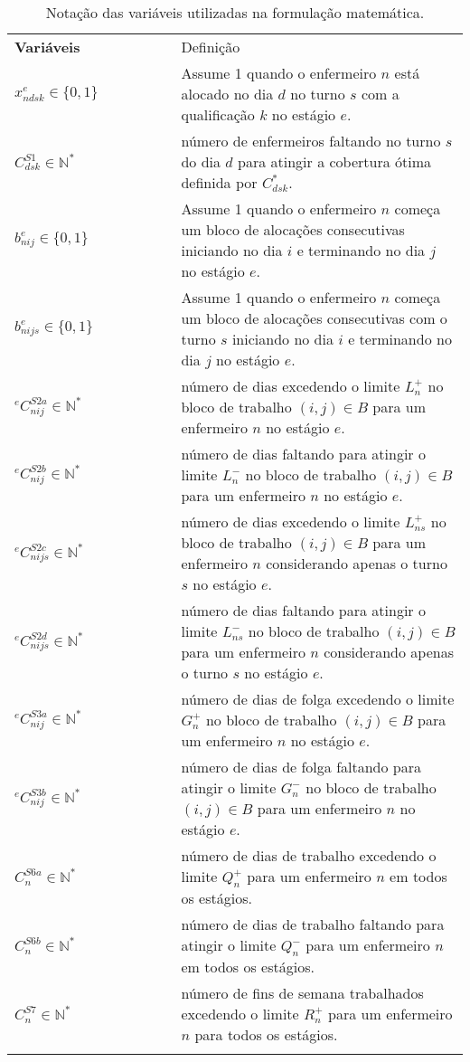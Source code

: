 \documentclass[cic,tc, twoside]{iiufrgs}
\begin{document}
\begin{table}[H]
\centering
\caption{Notação das variáveis utilizadas na formulação matemática.}
\small
\begin{tabularx}{\linewidth}{l@{}X}
\hline\noalign{\smallskip}
\textbf{Variáveis}{~~~~~~~~~~~~}  & Definição  \\
\noalign{\smallskip}\hline\noalign{\smallskip}
$x^e_{ndsk} \in \{0,1\}$        & Assume 1 quando o enfermeiro $n$ está alocado no dia $d$ no turno $s$ com a qualificação $k$ no estágio $e$.  \\
$C^{S1}_{dsk} \in \mathbb{N^*}$   & número de enfermeiros faltando no turno $s$ do dia $d$ para atingir a cobertura ótima definida por $C^*_{dsk}$.  \\
$b^e_{nij} \in  \{0,1\} $ & Assume 1 quando o enfermeiro $n$ começa um bloco de alocações consecutivas iniciando no dia $i$ e terminando no dia $j$ no estágio $e$.\\
$b^e_{nijs} \in  \{0,1\} $ & Assume 1 quando o enfermeiro $n$ começa um bloco de alocações consecutivas com o turno $s$ iniciando no dia $i$ e terminando no dia $j$ no estágio $e$.\\
$^eC^{S2a}_{nij} \in \mathbb{N^*}$   & número de dias excedendo o limite $L^+_{n}$ no bloco de trabalho $(i,j) \in B$ para um enfermeiro $n$ no estágio $e$.  \\
$^eC^{S2b}_{nij} \in \mathbb{N^*}$   & número de dias faltando para atingir o limite $L^-_{n}$ no bloco de trabalho $(i,j) \in B$ para um enfermeiro $n$ no estágio $e$.  \\
$^eC^{S2c}_{nijs} \in \mathbb{N^*}$   & número de dias excedendo o limite $L^+_{ns}$ no bloco de trabalho $(i,j) \in B$ para um enfermeiro $n$ considerando apenas o turno $s$ no estágio $e$.  \\
$^eC^{S2d}_{nijs} \in \mathbb{N^*}$   & número de dias faltando para atingir o limite $L^-_{ns}$ no bloco de trabalho $(i,j) \in B$ para um enfermeiro $n$ considerando apenas o turno $s$ no estágio $e$.  \\
$^eC^{S3a}_{nij} \in \mathbb{N^*}$   & número de dias de folga excedendo o limite $G^+_{n}$ no bloco de trabalho $(i,j) \in B$ para um enfermeiro $n$ no estágio $e$.  \\
$^eC^{S3b}_{nij} \in \mathbb{N^*}$   & número de dias de folga faltando para atingir o limite $G^-_{n}$ no bloco de trabalho $(i,j) \in B$ para um enfermeiro $n$ no estágio $e$.  \\
$C^{S6a}_{n} \in \mathbb{N^*}$   & número de dias de trabalho excedendo o limite $Q^+_{n}$ para um enfermeiro $n$ em todos os estágios. \\
$C^{S6b}_{n} \in \mathbb{N^*}$   & número de dias de trabalho faltando para atingir o limite $Q^-_{n}$ para um enfermeiro $n$ em todos os estágios. \\
$C^{S7}_{n} \in \mathbb{N^*}$   & número de fins de semana trabalhados excedendo o limite $R^+_{n}$ para um enfermeiro $n$ para todos os estágios. \\
\noalign{\smallskip}\hline
\end{tabularx}
\label{tab:variaveis}
\end{table}
\end{document}
